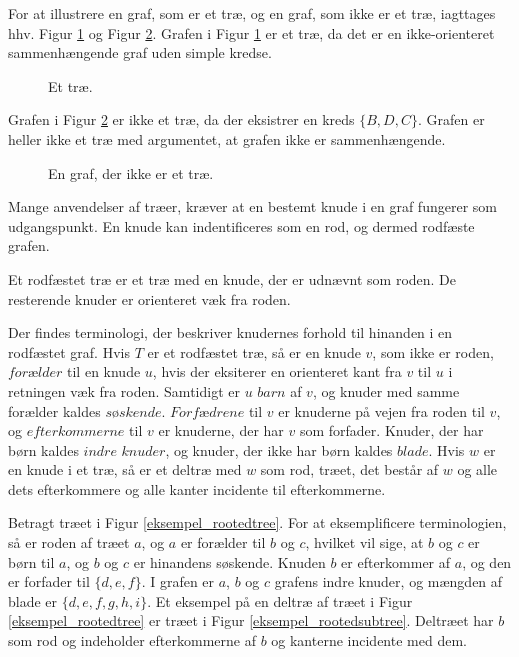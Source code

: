 \begin{exmp}
For at illustrere en graf, som er et træ, og en graf, som ikke er et træ, iagttages hhv. Figur \ref{eksempel_tree} og Figur \ref{eksempel_notree}. Grafen i Figur \ref{eksempel_tree} er et træ, da det er en ikke-orienteret sammenhængende graf uden simple kredse.
\end{exmp}

\begin{figure}[h]
\centering

\caption{Et træ.} 
\label{eksempel_tree}
\end{figure}

Grafen i Figur \ref{eksempel_notree} er ikke et træ, da der eksistrer en kreds $\lbrace B, D, C \rbrace$. Grafen er heller ikke et træ med argumentet, at grafen ikke er sammenhængende.\\

\begin{figure}[h]
\centering

\caption{En graf, der ikke er et træ.} 
\label{eksempel_notree}
\end{figure}

Mange anvendelser af træer, kræver at en bestemt knude i en graf fungerer som udgangspunkt. En knude kan indentificeres som en rod, og dermed rodfæste grafen.

\begin{defn}
Et rodfæstet træ er et træ med en knude, der er udnævnt som roden. De resterende knuder er orienteret væk fra roden.
\end{defn}

Der findes terminologi, der beskriver knudernes forhold til hinanden i en rodfæstet graf. 
Hvis $T$ er et rodfæstet træ, så er en knude $v$, som ikke er roden, $\textit{forælder}$ til en knude $u$, hvis der eksiterer en orienteret kant fra $v$ til $u$ i retningen væk fra roden.
Samtidigt er $u$ $\textit{barn}$ af $v$, og knuder med samme forælder kaldes $\textit{søskende}$. 
$\textit{Forfædrene}$ til $v$ er knuderne på vejen fra roden til $v$, og $\textit{efterkommerne}$ til $v$ er knuderne, der har $v$ som forfader. 
Knuder, der har børn kaldes $\textit{indre knuder}$, og knuder, der ikke har børn kaldes $\textit{blade}$.
Hvis $w$ er en knude i et træ, så er et deltræ med $w$ som rod, træet, det består af $w$ og alle dets efterkommere og alle kanter incidente til efterkommerne.

\begin{exmp}
Betragt træet i Figur \ref{eksempel_rootedtree}. 
For at eksemplificere terminologien, så er roden af træet $a$, og $a$ er forælder til $b$ og $c$, hvilket vil sige, at $b$ og $c$ er børn til $a$, og $b$ og $c$ er hinandens søskende. 
Knuden $b$ er efterkommer af $a$, og den er forfader til $\lbrace d, e, f \rbrace$. 
I grafen er $a$, $b$ og $c$ grafens indre knuder, og mængden af blade er $\lbrace d, e, f, g, h, i \rbrace$. 
Et eksempel på en deltræ af træet i Figur \ref{eksempel_rootedtree} er træet i Figur \ref{eksempel_rootedsubtree}.
Deltræet har $b$ som rod og indeholder efterkommerne af $b$ og kanterne incidente med dem. 
\end{exmp}

